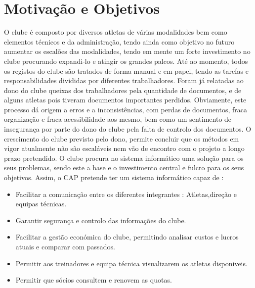 \documentclass[a4paper,12pt]{scrreprt}
\begin{document}
\section{Motivação e Objetivos}
O clube é composto por diversos atletas de várias modalidades bem como elementos técnicos e da administração, tendo ainda como objetivo no futuro aumentar os escalões das modalidades, tendo em mente um forte investimento no clube procurando expandi-lo e atingir os grandes palcos.
Até ao momento, todos os registos do clube são tratados de forma manual e em papel, tendo as tarefas e responsabilidades divididas por diferentes trabalhadores. Foram já relatadas ao dono do clube queixas dos trabalhadores pela quantidade de documentos, e de alguns atletas pois tiveram documentos importantes perdidos. Obviamente, este processo dá origem a erros e a inconsistências, com perdas de documentos, fraca organização e fraca acessibilidade aos mesmo, bem como um sentimento de insegurança por parte do dono do clube pela falta de controlo dos documentos.
O crescimento do clube previsto pelo dono, permite concluir que os métodos em vigor atualmente não são escaláveis nem vão de encontro com o projeto a longo prazo pretendido.
O clube procura no sistema informático uma solução para os seus problemas, sendo este a base e o investimento central e fulcro para os seus objetivos.
Assim, o CAP pretende ter um sistema informático capaz de :
\begin{itemize}
    \item Facilitar a comunicação entre os diferentes integrantes : Atletas,direção e equipas técnicas.
    \item Garantir segurança e controlo das informações do clube.
    \item Facilitar a gestão económica do clube, permitindo analisar custos e lucros atuais e comparar com passados.
    \item Permitir aos treinadores e equipa técnica visualizarem os atletas disponiveis.
    \item Permitir que sócios consultem e renovem as quotas.
\end{itemize}
\end{document}
